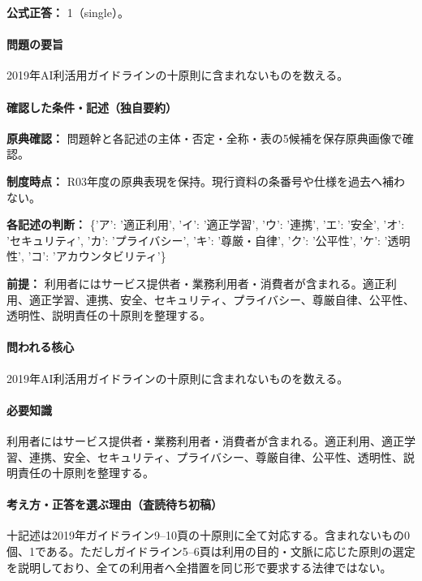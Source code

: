 \textbf{公式正答：} 1（single）。

\paragraph{問題の要旨} 2019年AI利活用ガイドラインの十原則に含まれないものを数える。

\paragraph{確認した条件・記述（独自要約）}\mbox{}\par

\noindent\textbf{原典確認：} 問題幹と各記述の主体・否定・全称・表の5候補を保存原典画像で確認。\par

\noindent\textbf{制度時点：} R03年度の原典表現を保持。現行資料の条番号や仕様を過去へ補わない。\par

\noindent\textbf{各記述の判断：} \{'ア': '適正利用', 'イ': '適正学習', 'ウ': '連携', 'エ': '安全', 'オ': 'セキュリティ', 'カ': 'プライバシー', 'キ': '尊厳・自律', 'ク': '公平性', 'ケ': '透明性', 'コ': 'アカウンタビリティ'\}\par

\noindent\textbf{前提：} 利用者にはサービス提供者・業務利用者・消費者が含まれる。適正利用、適正学習、連携、安全、セキュリティ、プライバシー、尊厳自律、公平性、透明性、説明責任の十原則を整理する。\par

\paragraph{問われる核心} 2019年AI利活用ガイドラインの十原則に含まれないものを数える。

\paragraph{必要知識} 利用者にはサービス提供者・業務利用者・消費者が含まれる。適正利用、適正学習、連携、安全、セキュリティ、プライバシー、尊厳自律、公平性、透明性、説明責任の十原則を整理する。

\paragraph{考え方・正答を選ぶ理由（査読待ち初稿）} 十記述は2019年ガイドライン9--10頁の十原則に全て対応する。含まれないもの0個、1である。ただしガイドライン5--6頁は利用の目的・文脈に応じた原則の選定を説明しており、全ての利用者へ全措置を同じ形で要求する法律ではない。

